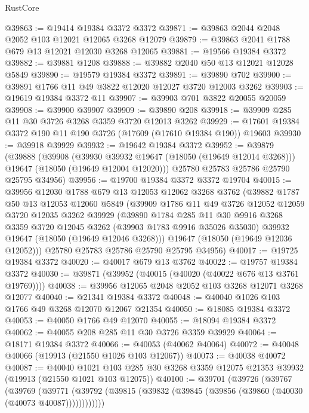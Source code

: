 \begin{lexlean}{RustCore}
\begin{coremodule}
@39863 := @19414 @19384 @3372 @3372
@39871 := @39863 @2044 @2048 @2052 @103 @12021 @12065 @3268 @12079
@39879 := @39863 @2041 @1788 @679 @13 @12021 @12030 @3268 @12065
@39881 := @19566 @19384 @3372
@39882 := @39881 @1208
@39888 := @39882 @2040 @50 @13 @12021 @12028 @5849
@39890 := @19579 @19384 @3372
@39891 := @39890 @702
@39900 := @39891 @1766 @11 @49 @3822 @12020 @12027 @3720 @12003 @3262
@39903 := @19619 @19384 @3372 @11
@39907 := @39903 @701 @3822 @20055 @20059
@39908 := @39900 @39907
@39909 := @39890 @208
@39918 := @39909 @285 @11 @30 @3726 @3268 @3359 @3720 @12013 @3262
@39929 := @17601 @19384 @3372 @190 @11 @190 @3726 (@17609 (@17610 @19384 @190)) @19603
@39930 := @39918 @39929
@39932 := @19642 @19384 @3372
@39952 := @39879
    (@39888
      (@39908
        (@39930 @39932 @19647 (@18050 (@19649 @12014 @3268)))
        @19647
        (@18050 (@19649 @12004 @12020)))
      @25780
      @25783
      @25786
      @25790
      @25795
      @34956)
@39956 := @19700 @19384 @3372 @3372 @19704
@40015 := @39956
    @12030
    @1788
    @679
    @13
    @12053
    @12062
    @3268
    @3762
    (@39882
      @1787
      @50
      @13
      @12053
      @12060
      @5849
      (@39909
        @1786
        @11
        @49
        @3726
        @12052
        @12059
        @3720
        @12035
        @3262
        @39929
        (@39890
          @1784
          @285
          @11
          @30
          @9916
          @3268
          @3359
          @3720
          @12045
          @3262
          (@39903 @1783 @9916 @35026 @35030)
          @39932
          @19647
          (@18050 (@19649 @12046 @3268)))
        @19647
        (@18050 (@19649 @12036 @12052)))
      @25780
      @25783
      @25786
      @25790
      @25795
      @34956)
@40017 := @19725 @19384 @3372
@40020 := @40017 @679 @13 @3762
@40022 := @19757 @19384 @3372
@40030 := @39871 (@39952 (@40015 (@40020 (@40022 @676 @13 @3761 @19769))))
@40038 := @39956 @12065 @2048 @2052 @103 @3268 @12071 @3268 @12077
@40040 := @21341 @19384 @3372
@40048 := @40040 @1026 @103 @1766 @49 @3268 @12070 @12067 @21354
@40050 := @18085 @19384 @3372
@40053 := @40050 @1766 @49 @12070
@40055 := @18094 @19384 @3372
@40062 := @40055 @208 @285 @11 @30 @3726 @3359 @39929
@40064 := @18171 @19384 @3372
@40066 := @40053 (@40062 @40064)
@40072 := @40048 @40066 (@19913 (@21550 @1026 @103 @12067))
@40073 := @40038 @40072
@40087 := @40040
    @1021
    @103
    @285
    @30
    @3268
    @3359
    @12075
    @21353
    @39932
    (@19913 (@21550 @1021 @103 @12075))
@40100 := @39701
    (@39726
      (@39767
        (@39769
          (@39771 (@39792 (@39815 (@39832 (@39845 (@39856 (@39860 (@40030 (@40073 @40087))))))))))))

\end{coremodule}
\end{lexlean}
